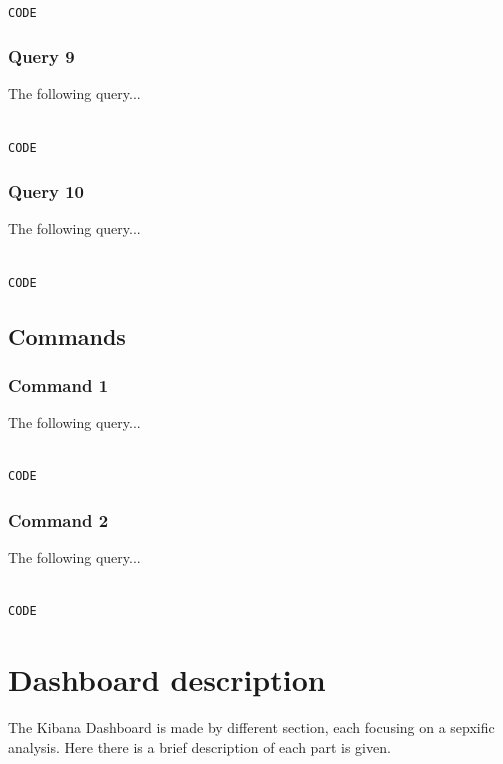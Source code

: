 \documentclass{article}
\begin{document}
\begin{lstlisting}[language=cypher, label=lst:cypher-example]

CODE

\end{lstlisting}
\subsubsection{Query 9}
The following query...

\begin{lstlisting}[language=cypher, label=lst:cypher-example]

CODE

\end{lstlisting}
\subsubsection{Query 10}
The following query...

\begin{lstlisting}[language=cypher, label=lst:cypher-example]

CODE

\end{lstlisting}
\newpage
\subsection{Commands}
\subsubsection{Command 1}
The following query...

\begin{lstlisting}[language=cypher, label=lst:cypher-example]

CODE

\end{lstlisting}
\subsubsection{Command 2}
The following query...

\begin{lstlisting}[language=cypher, label=lst:cypher-example]

CODE

\end{lstlisting}
\newpage

\section{Dashboard description}
The Kibana Dashboard is made by different section, each focusing on a sepxific analysis.
Here there is a brief description of each part is given.
\end{document}
